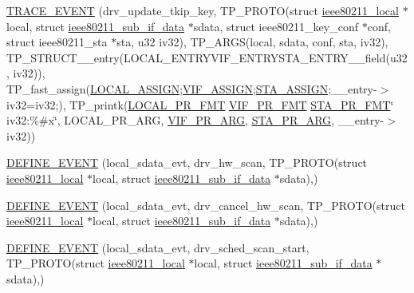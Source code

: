 \begin{DoxyCompactItemize}
\hyperlink{driver-trace_8h_af3c41742ab97e1e469523541b416c437}{T\-R\-A\-C\-E\-\_\-\-E\-V\-E\-N\-T} (drv\-\_\-update\-\_\-tkip\-\_\-key, T\-P\-\_\-\-P\-R\-O\-T\-O(struct \hyperlink{structieee80211__local}{ieee80211\-\_\-local} $\ast$local, struct \hyperlink{structieee80211__sub__if__data}{ieee80211\-\_\-sub\-\_\-if\-\_\-data} $\ast$sdata, struct ieee80211\-\_\-key\-\_\-conf $\ast$conf, struct ieee80211\-\_\-sta $\ast$sta, u32 iv32), T\-P\-\_\-\-A\-R\-G\-S(local, sdata, conf, sta, iv32), T\-P\-\_\-\-S\-T\-R\-U\-C\-T\-\_\-\-\_\-entry(L\-O\-C\-A\-L\-\_\-\-E\-N\-T\-R\-Y\-V\-I\-F\-\_\-\-E\-N\-T\-R\-Y\-S\-T\-A\-\_\-\-E\-N\-T\-R\-Y\-\_\-\-\_\-field(u32, iv32)), T\-P\-\_\-fast\-\_\-assign(\hyperlink{driver-trace_8h_ab19d9141887ea92ef9640df06a51e0a1}{L\-O\-C\-A\-L\-\_\-\-A\-S\-S\-I\-G\-N};\hyperlink{driver-trace_8h_af5ede80f04ffcb3f644f68837b1d252c}{V\-I\-F\-\_\-\-A\-S\-S\-I\-G\-N};\hyperlink{driver-trace_8h_abbd837b5fc444c0cb48b5954f8ad068a}{S\-T\-A\-\_\-\-A\-S\-S\-I\-G\-N};\-\_\-\-\_\-entry-\/$>$iv32=iv32;), T\-P\-\_\-printk(\hyperlink{driver-trace_8h_a09833af423135e21ffe99a59ae088cf1}{L\-O\-C\-A\-L\-\_\-\-P\-R\-\_\-\-F\-M\-T} \hyperlink{driver-trace_8h_a50711161ccfc99a73b43b988149a61a5}{V\-I\-F\-\_\-\-P\-R\-\_\-\-F\-M\-T} \hyperlink{driver-trace_8h_a73d0cd445b999888e3f21698b769c843}{S\-T\-A\-\_\-\-P\-R\-\_\-\-F\-M\-T}\char`\"{} iv32\-:\%\#x\char`\"{}, L\-O\-C\-A\-L\-\_\-\-P\-R\-\_\-\-A\-R\-G, \hyperlink{driver-trace_8h_a12c9f3afcd1c461f7ae2f86fd8503977}{V\-I\-F\-\_\-\-P\-R\-\_\-\-A\-R\-G}, \hyperlink{driver-trace_8h_a3b71cc34bae124028f19970a4220d4ab}{S\-T\-A\-\_\-\-P\-R\-\_\-\-A\-R\-G}, \-\_\-\-\_\-entry-\/$>$iv32))
\item 
\hyperlink{driver-trace_8h_a5ac6d2350379fbff31d80abd5f33bac5}{D\-E\-F\-I\-N\-E\-\_\-\-E\-V\-E\-N\-T} (local\-\_\-sdata\-\_\-evt, drv\-\_\-hw\-\_\-scan, T\-P\-\_\-\-P\-R\-O\-T\-O(struct \hyperlink{structieee80211__local}{ieee80211\-\_\-local} $\ast$local, struct \hyperlink{structieee80211__sub__if__data}{ieee80211\-\_\-sub\-\_\-if\-\_\-data} $\ast$sdata),)
\item 
\hyperlink{driver-trace_8h_ae88f34193a58d6a01ef516b063867332}{D\-E\-F\-I\-N\-E\-\_\-\-E\-V\-E\-N\-T} (local\-\_\-sdata\-\_\-evt, drv\-\_\-cancel\-\_\-hw\-\_\-scan, T\-P\-\_\-\-P\-R\-O\-T\-O(struct \hyperlink{structieee80211__local}{ieee80211\-\_\-local} $\ast$local, struct \hyperlink{structieee80211__sub__if__data}{ieee80211\-\_\-sub\-\_\-if\-\_\-data} $\ast$sdata),)
\item 
\hyperlink{driver-trace_8h_a72d73261eb16b1c953748a8b05157d1d}{D\-E\-F\-I\-N\-E\-\_\-\-E\-V\-E\-N\-T} (local\-\_\-sdata\-\_\-evt, drv\-\_\-sched\-\_\-scan\-\_\-start, T\-P\-\_\-\-P\-R\-O\-T\-O(struct \hyperlink{structieee80211__local}{ieee80211\-\_\-local} $\ast$local, struct \hyperlink{structieee80211__sub__if__data}{ieee80211\-\_\-sub\-\_\-if\-\_\-data} $\ast$sdata),)

\end{DoxyCompactItemize}

